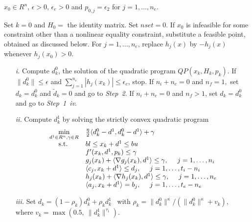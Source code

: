 \smallskip
{} $x_0\in R^n$, $\epsilon > 0$, $\epsilon_e>0$ and
$p_{0,j}=\epsilon_2$ for $j=1,\ldots,n_e$. 

\smallskip
{} Set $k=0$ and $H_0=$ the 
identity matrix. Set $nset=0$. If $x_0$ is infeasible for some constraint
other than a nonlinear equality constraint,
substitute a feasible point, obtained as discussed below.
For $j=1,\ldots,n_e$, replace $h_j(x)$ by $-h_j(x)$ whenever
$h_j(x_0)>0$.

\smallskip
{}

\begin{itemize}
\item[\it i.]Compute $d_{k}^{0}$, the solution of the quadratic program
$QP(x_k,H_k,p_k)$.  
If $\|d_k^0\|\leq \epsilon$
and $\sum_{j=1}^{n_e}|h_j(x_k)|\leq \epsilon_e$, stop. 
If $n_i+n_e=0$ and $n_f=1,$ set $d_k=d^0_k$ and $\tilde d_k =0$ and 
go to {\it Step~2}. If $n_i+n_e=0$ and $n_f > 1$, set $d_k=d^0_k$ and 
go to {\it Step~1~iv}.

\item[\it ii.]Compute $d_{k}^{1}$ by solving the strictly convex 
quadratic program
\smallskip
$$  \begin{array}{ll} \min\limits_{d^1\in R^n,\gamma \in R}  
                    & \frac{\eta}{2} 
                  \langle d_{k}^{0}-d^1,d_{k}^{0}-d^1 \rangle +\gamma \\
  {\rm ~~~~s.t.} &  bl \leq x_k+d^1 \leq bu\\
   &  f'(x_k,d^1,p_k) \leq \gamma\\
   &  g_j(x_k)+\langle \nabla g_j(x_k),d^1 \rangle
      \leq\gamma, ~~~~j=1,\ldots,n_i\\
   & \langle c_j,x_k  + d^1 \rangle \leq d_j,
      ~~~~j=1,\ldots,t_i-n_i \\
   &  h_j(x_k)+\langle \nabla h_j(x_k),d^1 \rangle
      \leq\gamma, ~~~~j=1,\ldots,n_e\\
   & \langle a_j,x_k  + d^1 \rangle=b_j,
                      ~~~~j=1,\ldots,t_e-n_e\end{array}$$
\smallskip
\item[\it iii.] Set $d_k=(1-\rho_k)d_k^0+\rho_kd_k^1$~
           with $\rho_k=\|d_k^0\|^{\kappa}/(\|d_k^0\|^{\kappa}+v_k)$,~
        where $v_k = \max(0.5,~\|d_k^1\|^{\tau _1}).$


\end{itemize}
